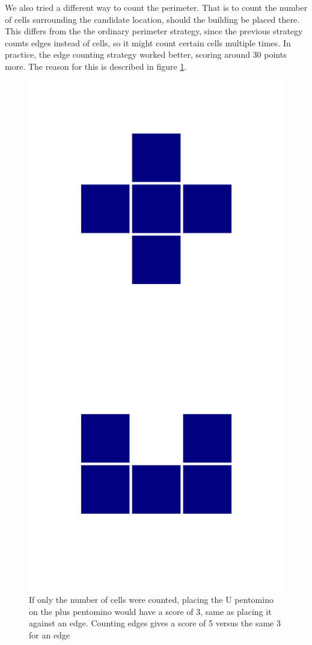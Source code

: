 We also tried a different way to count the perimeter. That is to count the number of cells surrounding the candidate location, should the building be placed there. This differs from the the ordinary perimeter strategy, since the previous strategy counts edges instead of cells, so it might count certain cells multiple times. In practice, the edge counting strategy worked better, scoring around 30 points more. The reason for this is described in figure \ref{fig:plusu}.

\begin{figure}
\center
\includegraphics[scale=0.05]{pentomino.jpg}
\caption{If only the number of cells were counted, placing the U pentomino on the plus pentomino would have a score of 3, same as placing it against an edge. Counting edges gives a score of 5 versus the same 3 for an edge}
\label{fig:plusu}
\end{figure}

